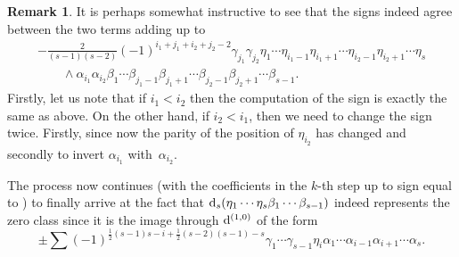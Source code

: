 \documentclass[10pt,a4paper]{amsart}
\numberwithin{equation}{section}
\theoremstyle{definition}
\newtheorem{rem}[tw]{Remark}
\begin{document}
\begin{rem} It is perhaps somewhat instructive to see that the signs indeed agree between the two terms adding up to
\begin{gather*}
-\frac{2}{(s-1)(s-2)} (-1)^{i_1+j_1+i_2+j_2-2}\gamma_{j_1}\gamma_{j_2}\eta_1\cdots \eta_{i_1-1}\eta_{i_1+1}\cdots \eta_{i_2-1}\eta_{i_2+1}\cdots\eta_s \\
\qquad{}\wedge
\alpha_{i_1}\alpha_{i_2}\beta_1\cdots \beta_{j_1-1}\beta_{j_1+1}\cdots \beta_{j_2-1}\beta_{j_2+1}\cdots \beta_{s-1}.
\end{gather*}
Firstly, let us note that if $i_1<i_2$ then the computation of the sign is exactly the same as above. On the other hand, if $i_2<i_1$, then we need to change the sign twice. Firstly, since now the parity of the position of $\eta_{i_2}$ has changed and secondly to invert $\alpha_{i_1}$ with~$\alpha_{i_2}$.
\end{rem}
The process now continues (with the coefficients in the $k$-th step up to sign equal to ) to finally arrive at the fact that ${\rm d}_s(\eta_1\cdots \eta_s\beta_1\cdots \beta_{s-1})$ indeed represents the zero class since it is the image through ${\rm d}^{(1,0)}$ of the form
\[\pm\sum (-1)^{\frac{1}{2}(s-1)s-i+\frac{1}{2}(s-2)(s-1)-s}\gamma_1\cdots \gamma_{s-1}\eta_i\alpha_{1}\cdots \alpha_{i-1}\alpha_{i+1}\cdots \alpha_s.\]
\end{document}
